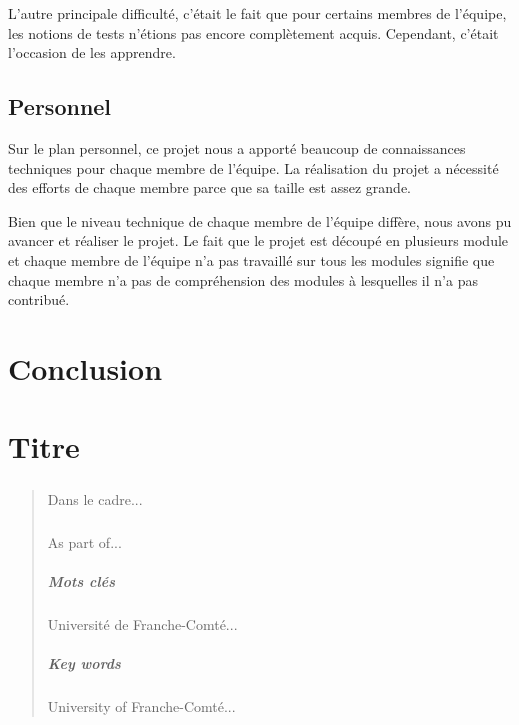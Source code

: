 \documentclass[a4paper,12pt]{report}
\begin{document}
L'autre principale difficulté, c'était le fait que pour certains membres de l'équipe, les notions de tests n'étions pas encore complètement acquis. Cependant, c'était l'occasion de les apprendre.

\section{Personnel}
Sur le plan personnel, ce projet nous a apporté beaucoup de connaissances techniques pour chaque membre de l'équipe. La réalisation du projet a nécessité des efforts de chaque membre parce que sa taille est assez grande. 

Bien que le niveau technique de chaque membre de l'équipe diffère, nous avons pu avancer et réaliser le projet. Le fait que le projet est découpé en plusieurs module et chaque membre de l'équipe n'a pas travaillé sur tous les modules signifie que chaque membre n'a pas de compréhension des modules à lesquelles il n'a pas contribué.

\chapter*{Conclusion}

\appendix

\chapter{Titre}

\newpage

\listoffigures

\begin{abstract}
\paragraph{}
Dans le cadre...
\paragraph{}
As part of...
\paragraph{Mots clés}
Université de Franche-Comté...
\paragraph{Key words}
University of Franche-Comté...
\end{abstract}
\end{document}
